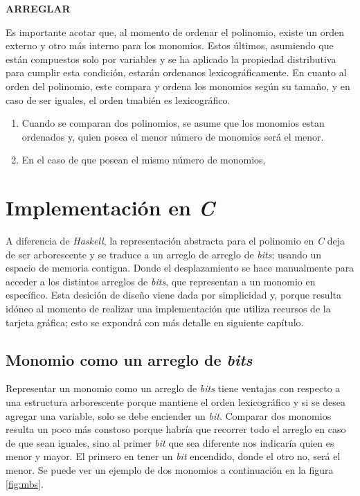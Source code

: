 \textbf{ARREGLAR}

Es importante acotar que, al momento de ordenar el polinomio, existe un orden externo y otro más interno para los monomios. Estos últimos, asumiendo que están compuestos solo por variables y se ha aplicado la propiedad distributiva para cumplir esta condición, estarán ordenanos lexicográficamente. En cuanto al orden del polinomio, este compara y ordena los monomios según su tamaño, y en caso de ser iguales, el orden tmabién es lexicográfico. %

\begin{enumerate}
    \item Cuando se comparan dos polinomios, se asume que los monomios estan ordenados y, quien posea el menor número de monomios será el menor.
    \item En el caso de que posean el mismo número de monomios, 
\end{enumerate}

\section{Implementación en \textit{C}}

A diferencia de \textit{Haskell}, la representación abstracta para el polinomio en \textit{C} deja de ser arborescente y se traduce a un arreglo de arreglo de \textit{bits}; usando un espacio de memoria contigua. Donde el desplazamiento se hace manualmente para acceder a los distintos arreglos de \textit{bits}, que representan a un monomio en específico. Esta desición de diseño viene dada por simplicidad y, porque resulta idóneo al momento de realizar una implementación que utiliza recursos de la tarjeta gráfica; esto se expondrá con más detalle en siguiente capítulo.

\subsection{Monomio como un arreglo de \textit{bits}}

Representar un monomio como un arreglo de \textit{bits} tiene ventajas con respecto a una estructura arborescente porque mantiene el orden lexicográfico y si se desea agregar una variable, solo se debe enciender un \textit{bit}. Comparar dos monomios resulta un poco más constoso porque habría que recorrer todo el arreglo en caso de que sean iguales, sino al primer \textit{bit} que sea diferente nos indicaría quien es menor y mayor. El primero en tener un \textit{bit} encendido, donde el otro no, será el menor. Se puede ver un ejemplo de dos monomios a continuación en la figura \ref{fig:mbs}.

